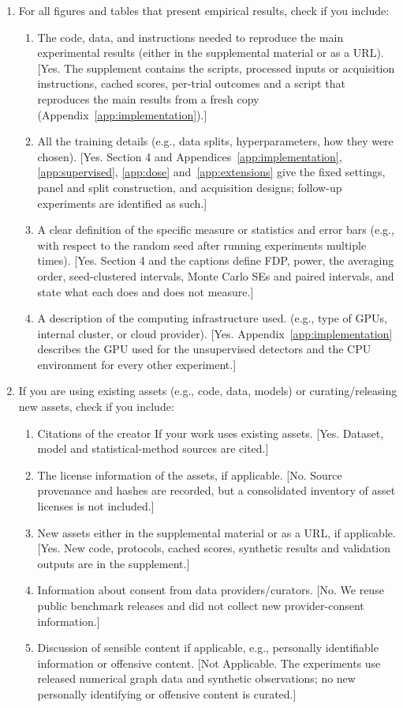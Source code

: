 \begin{enumerate}
  \item For all figures and tables that present empirical results, check if you include:
  \begin{enumerate}
    \item The code, data, and instructions needed to reproduce the main experimental results (either in the supplemental material or as a URL). [Yes. The supplement contains the scripts, processed inputs or acquisition instructions, cached scores, per-trial outcomes and a script that reproduces the main results from a fresh copy (Appendix~\ref{app:implementation}).]
    \item All the training details (e.g., data splits, hyperparameters, how they were chosen). [Yes. Section 4 and Appendices~\ref{app:implementation}, \ref{app:supervised}, \ref{app:dose} and~\ref{app:extensions} give the fixed settings, panel and split construction, and acquisition designs; follow-up experiments are identified as such.]
    \item A clear definition of the specific measure or statistics and error bars (e.g., with respect to the random seed after running experiments multiple times). [Yes. Section 4 and the captions define FDP, power, the averaging order, seed-clustered intervals, Monte Carlo SEs and paired intervals, and state what each does and does not measure.]
    \item A description of the computing infrastructure used. (e.g., type of GPUs, internal cluster, or cloud provider). [Yes. Appendix~\ref{app:implementation} describes the GPU used for the unsupervised detectors and the CPU environment for every other experiment.]
  \end{enumerate}

  \item If you are using existing assets (e.g., code, data, models) or curating/releasing new assets, check if you include:
  \begin{enumerate}
    \item Citations of the creator If your work uses existing assets. [Yes. Dataset, model and statistical-method sources are cited.]
    \item The license information of the assets, if applicable. [No. Source provenance and hashes are recorded, but a consolidated inventory of asset licenses is not included.]
    \item New assets either in the supplemental material or as a URL, if applicable. [Yes. New code, protocols, cached scores, synthetic results and validation outputs are in the supplement.]
    \item Information about consent from data providers/curators. [No. We reuse public benchmark releases and did not collect new provider-consent information.]
    \item Discussion of sensible content if applicable, e.g., personally identifiable information or offensive content. [Not Applicable. The experiments use released numerical graph data and synthetic observations; no new personally identifying or offensive content is curated.]
  \end{enumerate}


\end{enumerate}

